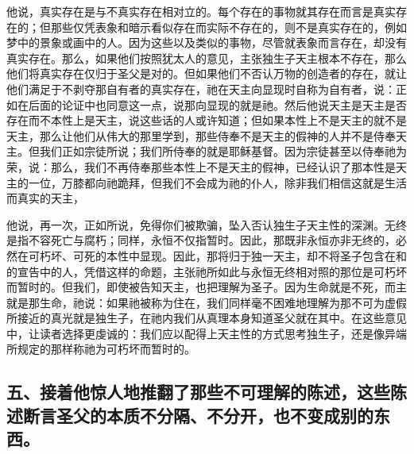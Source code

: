 他说，真实存在是与不真实存在相对立的。每个存在的事物就其存在而言是真实存在的；但那些仅凭表象和暗示看似存在而实际不存在的，则不是真实存在的，例如梦中的景象或画中的人。因为这些以及类似的事物，尽管就表象而言存在，却没有真实存在。那么，如果他们按照犹太人的意见，主张独生子天主根本不存在，那么他们将真实存在仅归于圣父是对的。但如果他们不否认万物的创造者的存在，就让他们满足于不剥夺那自有者的真实存在，祂在天主向显现时自称为自有者，说：正如在后面的论证中也同意这一点，说那向显现的就是祂。然后他说天主是天主是否存在而不本性上是天主，说这些话的人或许知道；但如果本性上不是天主的就不是天主，那么让他们从伟大的那里学到，那些侍奉不是天主的假神的人并不是侍奉天主。但我们正如宗徒所说；我们所侍奉的就是耶稣基督。因为宗徒甚至以侍奉祂为荣，说：那么，我们不再侍奉那些本性上不是天主的假神，已经认识了那本性是天主的一位，万膝都向祂跪拜，但我们不会成为祂的仆人，除非我们相信这就是生活而真实的天主，\par

他说，再一次，正如所说，免得你们被欺骗，坠入否认独生子天主性的深渊。无终是指不容死亡与腐朽；同样，永恒不仅指暂时。因此，那既非永恒亦非无终的，必然在可朽坏、可死的本性中显现。因此，那将归于独一天主，却不将圣子包含在和的宣告中的人，凭借这样的命题，主张祂所如此与永恒无终相对照的那位是可朽坏而暂时的。但我们，即使被告知天主，也把理解为圣子。因为生命就是不死，而主就是那生命，祂说：如果祂被称为住在，我们同样毫不困难地理解为那不可为虚假所接近的真光就是独生子，在祂内我们从真理本身知道圣父就在其中。在这些意见中，让读者选择更虔诚的：我们应以配得上天主性的方式思考独生子，还是像异端所规定的那样称祂为可朽坏而暂时的。\par


\subsection{五、接着他惊人地推翻了那些不可理解的陈述，这些陈述断言圣父的本质不分隔、不分开，也不变成别的东西。}

